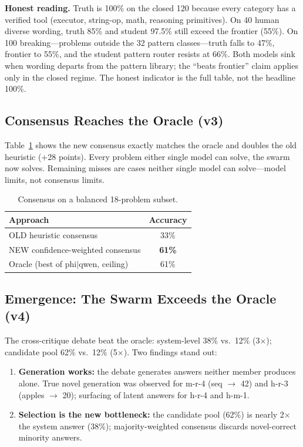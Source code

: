 \documentclass[conference,compsoc]{IEEEtran}
\begin{document}
\textbf{Honest reading.} Truth is 100\% on the closed 120 because every category has a verified tool (executor, string-op, math, reasoning primitives). On 40 human diverse wording, truth 85\% and student 97.5\% still exceed the frontier (55\%). On 100 breaking---problems outside the 32 pattern classes---truth falls to 47\%, frontier to 55\%, and the student pattern router resists at 66\%. Both models sink when wording departs from the pattern library; the ``beats frontier'' claim applies only in the closed regime. The honest indicator is the full table, not the headline 100\%.

\subsection{Consensus Reaches the Oracle (v3)}
Table~\ref{tab:consensus} shows the new consensus exactly matches the oracle and doubles the old heuristic (+28 points). Every problem either single model can solve, the swarm now solves. Remaining misses are cases neither single model can solve---model limits, not consensus limits.

\begin{table}[htbp]
\centering
\caption{Consensus on a balanced 18-problem subset.}
\label{tab:consensus}
\begin{tabular}{@{}lc@{}}
\toprule
Approach & Accuracy \\
\midrule
OLD heuristic consensus & 33\% \\
NEW confidence-weighted consensus & \textbf{61\%} \\
Oracle (best of phi$|$qwen, ceiling) & 61\% \\
\bottomrule
\end{tabular}
\end{table}

\subsection{Emergence: The Swarm Exceeds the Oracle (v4)}
The cross-critique debate beat the oracle: system-level 38\% vs.\ 12\% (3$\times$); candidate pool 62\% vs.\ 12\% (5$\times$). Two findings stand out:
\begin{enumerate}
\item \textbf{Generation works:} the debate generates answers neither member produces alone. True novel generation was observed for m-r-4 (seq $\rightarrow$ 42) and h-r-3 (apples $\rightarrow$ 20); surfacing of latent answers for h-r-4 and h-m-1.
\item \textbf{Selection is the new bottleneck:} the candidate pool (62\%) is nearly 2$\times$ the system answer (38\%); majority-weighted consensus discards novel-correct minority answers.
\end{enumerate}
\end{document}
